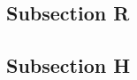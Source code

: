 \documentclass{article}
\begin{document}
\subsection{Subsection R}
\label{appendix:senseclus}

\subsection{Subsection H}


\biblio
\end{document}

